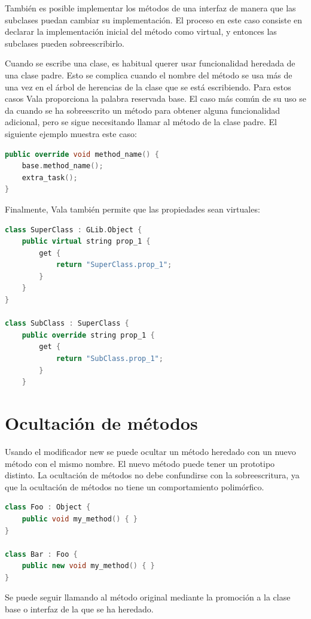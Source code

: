 \documentclass[12pt,twoside]{book}
\begin{document}
También es posible implementar los métodos de una interfaz de manera que las subclases puedan cambiar su implementación. El proceso en este caso consiste en declarar la implementación inicial del método como virtual, y entonces las subclases pueden sobreescribirlo.

Cuando se escribe una clase, es habitual querer usar funcionalidad heredada de una clase padre. Esto se complica cuando el nombre del método se usa más de una vez en el árbol de herencias de la clase que se está escribiendo. Para estos casos Vala proporciona la palabra reservada base. El caso más común de su uso se da cuando se ha sobreescrito un método para obtener alguna funcionalidad adicional, pero se sigue necesitando llamar al método de la clase padre. El siguiente ejemplo muestra este caso:

\begin{lstlisting}[language=C++]
public override void method_name() {
	base.method_name();
	extra_task();
}
\end{lstlisting}

Finalmente, Vala también permite que las propiedades sean virtuales:

\begin{lstlisting}[language=C++]
class SuperClass : GLib.Object {
	public virtual string prop_1 {
		get {
			return "SuperClass.prop_1";
		}
	}
}

class SubClass : SuperClass {
	public override string prop_1 {
		get {
			return "SubClass.prop_1";
		}
	}
\end{lstlisting}


\section{Ocultación de métodos}

Usando el modificador new se puede ocultar un método heredado con un nuevo método con el mismo nombre. El nuevo método puede tener un prototipo distinto. La ocultación de métodos no debe confundirse con la sobreescritura, ya que la ocultación de métodos no tiene un comportamiento polimórfico.

\begin{lstlisting}[language=C++]
class Foo : Object {
	public void my_method() { }
}

class Bar : Foo {
	public new void my_method() { }
}
\end{lstlisting}

Se puede seguir llamando al método original mediante la promoción a la clase base o interfaz de la que se ha heredado.
\end{document}
